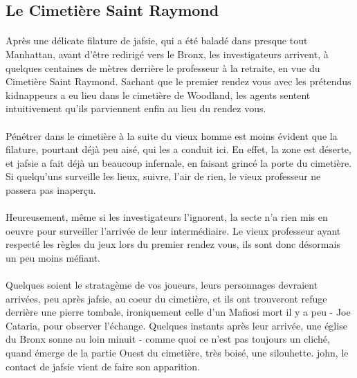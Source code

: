 \documentclass[a4paper,10pt]{article}
\begin{document}
\subsection{Le Cimetière Saint Raymond}

\paragraph{} Après une délicate filature de \gls{jafsie}, qui a été baladé dans presque tout Manhattan, avant d'être redirigé 
vers le Bronx, les investigateurs arrivent, à quelques centaines de mètres derrière le professeur à la retraite, en vue du 
Cimetière Saint Raymond. Sachant que le premier rendez vous avec les prétendus kidnappeurs a eu lieu dans le cimetière de Woodland,
les agents sentent intuitivement qu'ils parviennent enfin au lieu du rendez vous.

\paragraph{} Pénétrer dans le cimetière à la suite du vieux homme est moins évident que la filature, pourtant déjà peu aisé, qui
les a conduit ici. En effet, la zone est déserte, et \gls{jafsie} a fait déjà un beaucoup infernale, en faisant grincé la porte du 
cimetière. Si quelqu'uns surveille les lieux, suivre, l'air de rien, le vieux professeur ne passera pas inaperçu. 

\paragraph{} Heureusement, même si les investigateurs l'ignorent, la secte n'a rien mis en oeuvre pour surveiller l'arrivée de 
leur intermédiaire. Le vieux professeur ayant respecté les règles du jeux lors du premier rendez vous, ils sont donc désormais un 
peu moins méfiant.

\paragraph{} Quelques soient le stratagème de vos joueurs, leurs personnages devraient arrivées, peu après \gls{jafsie}, au coeur 
du cimetière, et ils ont trouveront refuge derrière une pierre tombale, ironiquement celle d'un Mafiosi mort il y a peu - Joe Cataria, 
pour observer l'échange. Quelques instants après leur arrivée, une église du Bronx sonne au loin minuit - comme quoi ce n'est pas toujours
un cliché, quand émerge de la partie Ouest du cimetière, très boisé, une silouhette. \gls{john}, le contact de \gls{jafsie} vient de 
faire son apparition.
\end{document}
